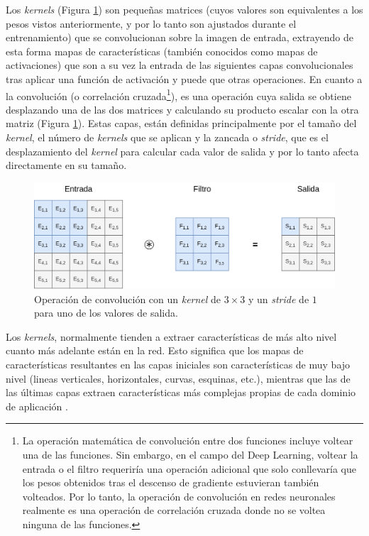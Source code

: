 Los \textit{kernels} (Figura \ref{fig:convolucion}) son pequeñas matrices (cuyos valores son equivalentes a los pesos vistos anteriormente, y por lo tanto son ajustados durante el entrenamiento) que se convolucionan sobre la imagen de entrada, extrayendo de esta forma mapas de características (también conocidos como mapas de activaciones) que son a su vez la entrada de las siguientes capas convolucionales tras aplicar una función de activación y puede que otras operaciones. En cuanto a la convolución (o correlación cruzada\footnote{La operación matemática de convolución entre dos funciones incluye voltear una de las funciones. Sin embargo, en el campo del Deep Learning, voltear la entrada o el filtro requeriría una operación adicional que solo conllevaría que los pesos obtenidos tras el descenso de gradiente estuvieran también volteados. Por lo tanto, la operación de convolución en redes neuronales realmente es una operación de correlación cruzada donde no se voltea ninguna de las funciones.}), es una operación cuya salida se obtiene desplazando una de las dos matrices y calculando su producto escalar con la otra matriz (Figura \ref{fig:convolucion}). Estas capas, están definidas principalmente por el tamaño del \textit{kernel}, el número de \textit{kernels} que se aplican y la zancada o \textit{stride}, que es el desplazamiento del \textit{kernel} para calcular cada valor de salida y por lo tanto afecta directamente en su tamaño. 

\begin{figure}[H]
\centering
\includegraphics[width=0.8\linewidth]{imagenes/convolucion.png} 
\captionsetup{width=.8\linewidth}
\caption{Operación de convolución con un \textit{kernel} de $3\times3$ y un \textit{stride} de $1$ para uno de los valores de salida.}
\label{fig:convolucion}
\end{figure}

Los \textit{kernels}, normalmente tienden a extraer características de más alto nivel cuanto más adelante están en la red. Esto significa que los mapas de características resultantes en las capas iniciales son características de muy bajo nivel (lineas verticales, horizontales, curvas, esquinas, etc.), mientras que las de las últimas capas extraen características más complejas propias de cada dominio de aplicación \cite{Visualizing and Understanding Convolutional Networks}.

